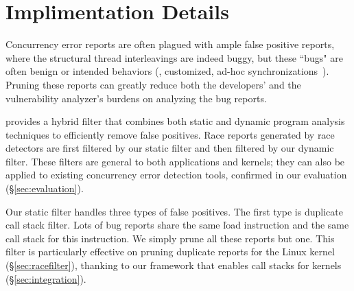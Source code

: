 \section{Implimentation Details} \label{sec:impl}

Concurrency error reports are often plagued with ample false positive reports,
where the structural thread interleavings are indeed buggy, but these ``bugs"
are often benign or intended behaviors (\eg, customized, ad-hoc
synchronizations~\cite{syncfinder:osdi10}). Pruning these reports can
greatly reduce both the developers' and the \xxx vulnerability analyzer's
burdens on analyzing the bug reports.

\xxx provides a hybrid filter that combines both static and dynamic program
analysis techniques to efficiently remove false positives. Race reports generated
by race detectors are first filtered by our static filter and then filtered by
our dynamic filter. These
filters are general to both applications and kernels; they can also be applied
to existing concurrency error detection tools, confirmed in our evaluation 
(\S\ref{sec:evaluation}).

Our static filter handles three types of false positives.
The first type is duplicate call stack filter. Lots of bug reports share the 
same \v{load} instruction and the same call stack for this instruction. We
simply prune all these reports but one. This filter is particularly effective 
on pruning duplicate reports for the Linux kernel (\S\ref{sec:racefilter}), 
thanking to our \xxx framework that enables call stacks for kernels 
(\S\ref{sec:integration}).






